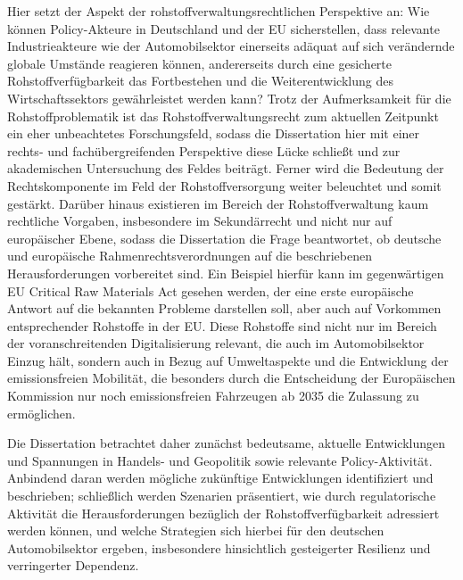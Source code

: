 \documentclass[12pt,a4paper,oneside]{book} %
\begin{document}
	Hier setzt der Aspekt der rohstoffverwaltungsrechtlichen Perspektive an: Wie können Policy-Akteure in Deutschland und der EU sicherstellen, dass relevante Industrieakteure wie der Automobilsektor einerseits adäquat auf sich verändernde globale Umstände reagieren können, andererseits durch eine gesicherte Rohstoffverfügbarkeit das Fortbestehen und die Weiterentwicklung des Wirtschaftssektors gewährleistet werden kann? Trotz der Aufmerksamkeit für die Rohstoffproblematik ist das Rohstoffverwaltungsrecht zum aktuellen Zeitpunkt ein eher unbeachtetes Forschungsfeld, sodass die Dissertation hier mit einer rechts- und fachübergreifenden Perspektive diese Lücke schließt und zur akademischen Untersuchung des Feldes beiträgt. Ferner wird die Bedeutung der Rechtskomponente im Feld der Rohstoffversorgung weiter beleuchtet und somit gestärkt. Darüber hinaus existieren im Bereich der Rohstoffverwaltung kaum rechtliche Vorgaben, insbesondere im Sekundärrecht und nicht nur auf europäischer Ebene, sodass die Dissertation die Frage beantwortet, ob deutsche und europäische Rahmenrechtsverordnungen auf die beschriebenen Herausforderungen vorbereitet sind. Ein Beispiel hierfür kann im gegenwärtigen EU Critical Raw Materials Act gesehen werden, der eine erste europäische Antwort auf die bekannten Probleme darstellen soll, aber auch auf Vorkommen entsprechender Rohstoffe in der EU. Diese Rohstoffe sind nicht nur im Bereich der voranschreitenden Digitalisierung relevant, die auch im Automobilsektor Einzug hält, sondern auch in Bezug auf Umweltaspekte und die Entwicklung der emissionsfreien Mobilität, die besonders durch die Entscheidung der Europäischen Kommission nur noch emissionsfreien Fahrzeugen ab 2035 die Zulassung zu ermöglichen.
	
	Die Dissertation betrachtet daher zunächst bedeutsame, aktuelle Entwicklungen und Spannungen in Handels- und Geopolitik sowie relevante Policy-Aktivität. Anbindend daran werden mögliche zukünftige Entwicklungen identifiziert und beschrieben; schließlich werden Szenarien präsentiert, wie durch regulatorische Aktivität die Herausforderungen bezüglich der Rohstoffverfügbarkeit adressiert werden können, und welche Strategien sich hierbei für den deutschen Automobilsektor ergeben, insbesondere hinsichtlich gesteigerter Resilienz und verringerter Dependenz. 
	
	
\end{document}
